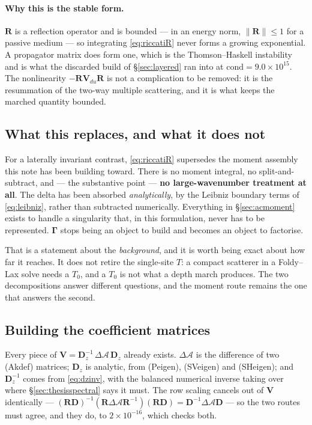 \documentclass[11pt,a4paper]{article}
\newcommand{\bV}{\mathbf{V}}
\newcommand{\dA}{\Delta\mathcal{A}}
\newcommand{\bR}{\mathbf{R}}
\begin{document}
\paragraph{Why this is the stable form.}  $\bR$ is a reflection operator and is
bounded --- in an energy norm, $\|\bR\|\le1$ for a passive medium --- so
integrating \eqref{eq:riccatiR} never forms a growing exponential.  A propagator
matrix does form one, which is the Thomson--Haskell instability and is what the
discarded build of \S\ref{sec:layered} ran into at
$\mathrm{cond} = 9.0\times10^{15}$.  The nonlinearity $-\bR\bV_{du}\bR$ is not a
complication to be removed: it is the resummation of the two-way multiple
scattering, and it is what keeps the marched quantity bounded.

\subsection{What this replaces, and what it does not}

For a laterally invariant contrast, \eqref{eq:riccatiR} supersedes the moment
assembly this note has been building toward.  There is no moment integral, no
split-and-subtract, and --- the substantive point --- \textbf{no large-wavenumber
treatment at all}.  The delta has been absorbed \emph{analytically}, by the
Leibniz boundary terms of \eqref{eq:leibniz}, rather than subtracted
numerically.  Everything in \S\ref{sec:acmoment} exists to handle a singularity
that, in this formulation, never has to be represented.
$\boldsymbol\Gamma$ stops being an object to build and becomes an object to
factorise.

That is a statement about the \emph{background}, and it is worth being exact
about how far it reaches.  It does not retire the single-site $T$: a compact
scatterer in a Foldy--Lax solve needs a $T_0$, and a $T_0$ is not what a depth
march produces.  The two decompositions answer different questions, and the
moment route remains the one that answers the second.

\subsection{Building the coefficient matrices}\label{sec:vblocks}

Every piece of $\bV = \mathbf{D}_z^{-1}\,\dA\,\mathbf{D}_z$ already exists.
$\dA$ is the difference of two (Akdef) matrices; $\mathbf{D}_z$ is analytic,
from (Peigen), (SVeigen) and (SHeigen); and $\mathbf{D}_z^{-1}$ comes from
\eqref{eq:dzinv}, with the balanced numerical inverse taking over where
\S\ref{sec:thesisspectral} says it must.  The row scaling cancels out of $\bV$
identically --- $(\mathbf{R}\mathbf{D})^{-1}(\mathbf{R}\dA\mathbf{R}^{-1})
(\mathbf{R}\mathbf{D}) = \mathbf{D}^{-1}\dA\mathbf{D}$ --- so the two routes must
agree, and they do, to $2\times10^{-16}$, which checks both.
\end{document}
